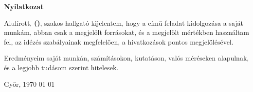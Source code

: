 \begin{center}
\large
\textbf{Nyilatkozat}\\
\end{center}

\noindent
Alulírott, \textbf{\szerzoVezeteknev{} \szerzoKeresztnev{} (\szerzoNeptun)}, \szak{} szakos hallgató kijelentem, hogy a \textit{\cim} című \MakeLowercase{\doktipus{}} feladat kidolgozása a saját munkám, abban csak a megjelölt forrásokat, és a megjelölt mértékben használtam fel, az idézés szabályainak megfelelően, a hivatkozások pontos megjelölésével.

\setlength\parskip{\baselineskip}

\noindent
Eredményeim saját munkán, számításokon, kutatáson, valós méréseken alapulnak, és a legjobb tudásom szerint hitelesek.

\vspace*{24pt}
\begin{multicols}{2}
	\noindent
	Győr, \today

	\columnbreak
	\noindent
	\makebox[7cm][c]{\rule{6cm}{.4pt}}\\
	\makebox[7cm][c]{\emph{\szerzoVezeteknev{} \szerzoKeresztnev}}\\
\end{multicols}

\thispagestyle{empty}

\vfill
\clearpage
\thispagestyle{empty} %

\selectthesislanguage
